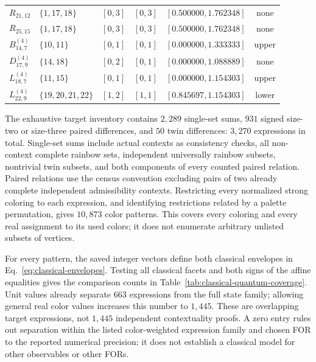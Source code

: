 \documentclass[aps,pra,reprint,superscriptaddress,longbibliography,nofootinbib,floatfix,10pt]{revtex4-2}
\theoremstyle{definition}\newtheorem{definition}[theorem]{Definition}
\theoremstyle{remark}\newtheorem{remark}[theorem]{Remark}
\begin{document}
\begin{table}[t]
\begin{ruledtabular}
\begin{tabular}{llcccc}
$R_{21,12}$ & $\{1,17,18\}$ & $[0,3]$ & $[0,3]$ & $[0.500000,1.762348]$ & none\\
$R_{25,15}$ & $\{1,17,18\}$ & $[0,3]$ & $[0,3]$ & $[0.500000,1.762348]$ & none\\
$B_{14,7}^{(4)}$ & $\{10,11\}$ & $[0,1]$ & $[0,1]$ & $[0.000000,1.333333]$ & upper\\
$D_{17,9}^{(4)}$ & $\{14,18\}$ & $[0,2]$ & $[0,1]$ & $[0.000000,1.088889]$ & none\\
$L_{18,7}^{(4)}$ & $\{11,15\}$ & $[0,1]$ & $[0,1]$ & $[0.000000,1.154303]$ & upper\\
$L_{22,9}^{(4)}$ & $\{19,20,21,22\}$ & $[1,2]$ & $[1,1]$ & $[0.845697,1.154303]$ & lower\\

\end{tabular}
\end{ruledtabular}
\end{table}

The exhaustive target inventory contains $2{,}289$ single-set sums, $931$ signed size-two or size-three paired differences, and $50$ twin differences: $3{,}270$ expressions in total. Single-set sums include actual contexts as consistency checks, all non-context complete rainbow sets, independent universally rainbow subsets, nontrivial twin subsets, and both components of every counted paired relation. Paired relations use the census convention excluding pairs of two already complete independent admissibility contexts. Restricting every normalized strong coloring to each expression, and identifying restrictions related by a palette permutation, gives $10{,}873$ color patterns. This covers every coloring and every real assignment to its used colors; it does not enumerate arbitrary unlisted subsets of vertices.

For every pattern, the saved integer vectors define both classical envelopes in Eq.~\eqref{eq:classical-envelopes}. Testing all classical facets and both signs of the affine equalities gives the comparison counts in Table~\ref{tab:classical-quantum-coverage}. Unit values already separate $663$ expressions from the full state family; allowing general real color values increases this number to $1{,}445$. These are overlapping target expressions, not $1{,}445$ independent contextuality proofs. A zero entry rules out separation within the listed color-weighted expression family and chosen FOR to the reported numerical precision; it does not establish a classical model for other observables or other FORs.
\end{document}
